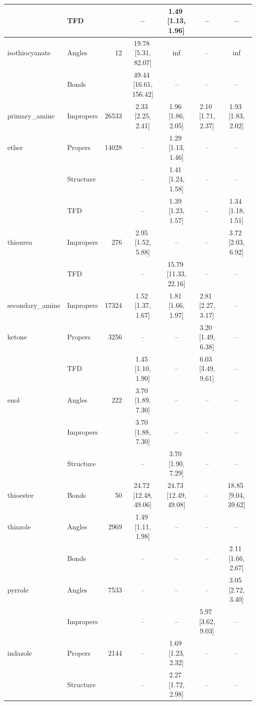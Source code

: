 \begin{longtable}[c]{ ll | r | c c c c}
     & TFD &  & -- & 1.49\,\,[1.13, 1.96] & -- & -- \\
    \hline
    isothiocyanate & Angles & 12 & 19.78\,\,[5.31, 82.07] & inf & -- & inf \\
     & Bonds &  & 49.44\,\,[16.61, 156.42] & -- & -- & -- \\
    \hline
    primary\_amine & Impropers & 26533 & 2.33\,\,[2.25, 2.41] & 1.96\,\,[1.86, 2.05] & 2.10\,\,[1.71, 2.37] & 1.93\,\,[1.83, 2.02] \\
    \hline
    ether & Propers & 14028 & -- & 1.29\,\,[1.13, 1.46] & -- & -- \\
     & Structure &  & -- & 1.41\,\,[1.24, 1.58] & -- & -- \\
     & TFD &  & -- & 1.39\,\,[1.23, 1.57] & -- & 1.34\,\,[1.18, 1.51] \\
    \hline
    thiourea & Impropers & 276 & 2.95\,\,[1.52, 5.88] & -- & -- & 3.72\,\,[2.03, 6.92] \\
     & TFD &  & -- & 15.79\,\,[11.33, 22.16] & -- & -- \\
    \hline
    secondary\_amine & Impropers & 17324 & 1.52\,\,[1.37, 1.67] & 1.81\,\,[1.66, 1.97] & 2.81\,\,[2.27, 3.17] & -- \\
    \hline
    ketone & Propers & 3256 & -- & -- & 3.20\,\,[1.49, 6.38] & -- \\
     & TFD &  & 1.45\,\,[1.10, 1.90] & -- & 6.03\,\,[3.49, 9.61] & -- \\
    \hline
    enol & Angles & 222 & 3.70\,\,[1.89, 7.30] & -- & -- & -- \\
     & Impropers &  & 3.70\,\,[1.88, 7.30] & -- & -- & -- \\
     & Structure &  & -- & 3.70\,\,[1.90, 7.29] & -- & -- \\
    \hline
    thioester & Bonds & 50 & 24.72\,\,[12.48, 49.06] & 24.73\,\,[12.49, 49.08] & -- & 18.85\,\,[9.04, 39.62] \\
    \hline
    thiazole & Angles & 2969 & 1.49\,\,[1.11, 1.98] & -- & -- & -- \\
     & Bonds &  & -- & -- & -- & 2.11\,\,[1.66, 2.67] \\
    \hline
    pyrrole & Angles & 7533 & -- & -- & -- & 3.05\,\,[2.72, 3.40] \\
     & Impropers &  & -- & -- & 5.97\,\,[3.62, 9.03] & -- \\
    \hline
    indazole & Propers & 2144 & -- & 1.69\,\,[1.23, 2.32] & -- & -- \\
     & Structure &  & -- & 2.27\,\,[1.72, 2.98] & -- & -- \\

\end{longtable}
